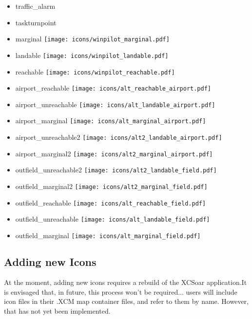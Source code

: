 \begin{itemize}
\item traffic\_alarm
\item taskturnpoint
\item marginal \texttt{[image: icons/winpilot\_marginal.pdf]}
\item landable \texttt{[image: icons/winpilot\_landable.pdf]}
\item reachable \texttt{[image: icons/winpilot\_reachable.pdf]}
\item airport\_reachable \texttt{[image: icons/alt\_reachable\_airport.pdf]}
\item airport\_unreachable \texttt{[image: icons/alt\_landable\_airport.pdf]}
\item airport\_marginal \texttt{[image: icons/alt\_marginal\_airport.pdf]}
\item airport\_unreachable2 \texttt{[image: icons/alt2\_landable\_airport.pdf]}
\item airport\_marginal2 \texttt{[image: icons/alt2\_marginal\_airport.pdf]}
\item outfield\_unreachable2 \texttt{[image: icons/alt2\_landable\_field.pdf]}
\item outfield\_marginal2 \texttt{[image: icons/alt2\_marginal\_field.pdf]}
\item outfield\_reachable \texttt{[image: icons/alt\_reachable\_field.pdf]}
\item outfield\_unreachable \texttt{[image: icons/alt\_landable\_field.pdf]}
\item outfield\_marginal \texttt{[image: icons/alt\_marginal\_field.pdf]}
\end{itemize}
\subsection{Adding new Icons}
At the moment, adding new icons requires a rebuild of the XCSoar application.It is envisaged that, in future, 
this process won't be required... users will include icon files in their .XCM map container files, and refer to them 
by name. However, that has not yet been implemented. 

